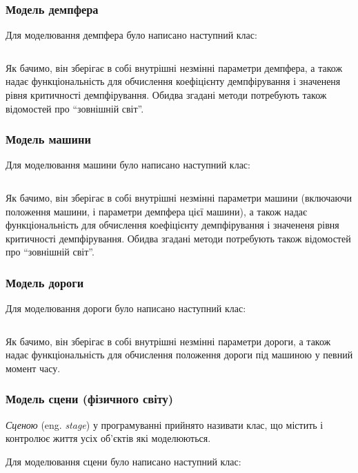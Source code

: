 \subsubsection{Модель демпфера}

Для моделювання демпфера було написано наступний клас:
\inputminted[firstline=5, lastline=33]{python}{../py/dashpot.py}

Як бачимо, він зберігає в собі внутрішні незмінні параметри демпфера, а також надає функціональність для обчислення коефіцієнту демпфірування і значененя рівня критичності демпфірування. Обидва згадані методи потребують також відомостей про ``зовнішній світ''.

\subsubsection{Модель машини}

Для моделювання машини було написано наступний клас:
\inputminted[firstline=5, lastline=35]{python}{../py/car.py}

Як бачимо, він зберігає в собі внутрішні незмінні параметри машини (включаючи положення машини, і параметри демпфера цієї машини), а також надає функціональність для обчислення коефіцієнту демпфірування і значененя рівня критичності демпфірування. Обидва згадані методи потребують також відомостей про ``зовнішній світ''.

\subsubsection{Модель дороги}

Для моделювання дороги було написано наступний клас:
\inputminted[firstline=5, lastline=26]{python}{../py/road.py}

Як бачимо, він зберігає в собі внутрішні незмінні параметри дороги, а також надає функціональність для обчислення положення дороги під машиною у певний момент часу. 

\subsubsection{Модель сцени (фізичного світу)}

\textit{Сценою} (eng. \textit{stage}) у програмуванні прийнято називати клас, що містить і контролює життя усіх об'єктів які моделюються. \medskip

Для моделювання сцени було написано наступний клас:
\inputminted[firstline=7, lastline=74]{python}{../py/stage.py}

